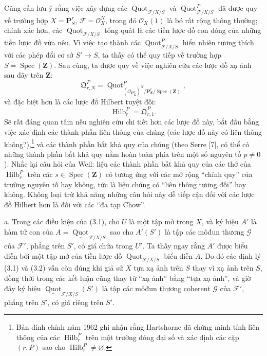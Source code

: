  Cũng cần lưu ý rằng việc xây dựng các
$\operatorname{Quot}_{\mathcal F/X/S}$ và
$\operatorname{Quot}^P_{\mathcal F/X/S}$ đã được quy về trường hợp
$X=\mathbf P^r_S$, $\mathcal F=\mathcal O_X^N$, trong đó
$\mathcal O_X(1)$ là bó rất rộng thông thường; chính xác hơn, các
$\operatorname{Quot}_{\mathcal F/X/S}$ tổng quát là các tiền lược đồ con đóng
của những tiền lược đồ vừa nêu. Vì việc tạo thành các
$\operatorname{Quot}^P_{\mathcal F/X/S}$ hiển nhiên tương thích với các phép
đổi cơ sở $S'\longrightarrow S$, ta thấy có thể quy tiếp về trường hợp
$S=\operatorname{Spec}(\mathbf Z)$. Sau cùng, ta được quy về việc nghiên
cứu các lược đồ xạ ảnh sau đây trên $\mathbf Z$:
\[
\mathfrak Q^P_{r,N}=
\operatorname{Quot}^{P}_{(\mathcal O_{\mathbf P^r_{\mathbf Z}})^N/
\mathbf P^r_{\mathbf Z}/\operatorname{Spec}(\mathbf Z)},
\]
và đặc biệt hơn là các lược đồ Hilbert tuyệt đối:
\[
\operatorname{Hilb}^P_r=\mathfrak Q^P_{r,1}.
\]
Sẽ rất đáng quan tâm nếu nghiên cứu chi tiết hơn các lược đồ này, bắt đầu bằng
việc xác định các thành phần liên thông của chúng (các lược đồ này có liên
thông không?),\footnote{Bản đính chính năm 1962 ghi nhận rằng Hartshorne đã
chứng minh tính liên thông của các $\operatorname{Hilb}^P_r$ trên một trường
đóng đại số và xác định các cặp $(r,P)$ sao cho
$\operatorname{Hilb}^P_r\neq\varnothing$.} và các thành phần bất khả quy của
chúng (theo Serre [7], có thể có những thành phần bất khả quy nằm hoàn toàn
phía trên một số nguyên tố $p\neq0$). Nhắc lại câu hỏi của Weil: liệu các thành
phần bất khả quy của các thớ của $\operatorname{Hilb}^P_r$ trên các
$s\in\operatorname{Spec}(\mathbf Z)$ có tương ứng với các mở rộng
``chính quy'' của trường nguyên tố hay không, tức là liệu chúng có ``liên thông
tương đối'' hay không. Không loại trừ khả năng những câu hỏi này dễ tiếp cận
đối với các lược đồ Hilbert hơn là đối với các ``đa tạp Chow''.


\noindent a. Trong các điều kiện của (3.1), cho $U$ là một tập mở trong $X$,
và ký hiệu $A'$ là hàm tử con của
$A=\underline{\operatorname{Quot}}_{\mathcal F/X/S}$ sao cho $A'(S')$ là tập
các môđun thương $\mathcal G$ của $\mathcal F'$, phẳng trên $S'$, có giá chứa
trong $U'$. Ta thấy ngay rằng $A'$ được biểu diễn bởi một tập mở của tiền lược
đồ $\operatorname{Quot}_{\mathcal F/X/S}$ biểu diễn $A$. Do đó các định lý
(3.1) và (3.2)
vẫn còn đúng khi giả sử $X$ tựa xạ ảnh trên $S$ thay vì xạ ảnh trên $S$, đồng
thời trong các kết luận cũng thay từ ``xạ ảnh'' bằng ``tựa xạ ảnh'', và giờ
đây ký hiệu
$\underline{\operatorname{Quot}}_{\mathcal F/X/S}(S')$ là tập các môđun
thương coherent $\mathcal G$ của $\mathcal F'$, phẳng trên $S'$, có giá riêng
trên $S'$.

